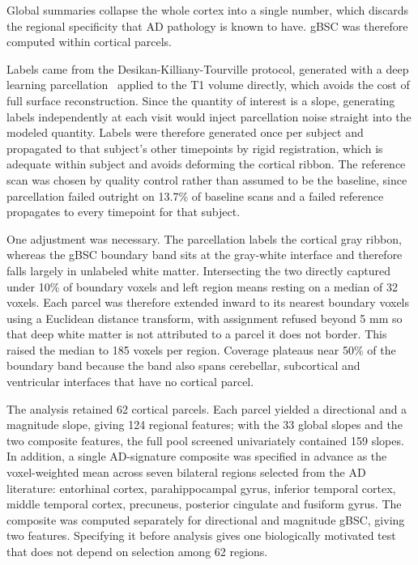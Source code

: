 \documentclass[blue]{ludusofficial}  %
\begin{document}
Global summaries collapse the whole cortex into a single number, which discards the regional specificity that AD pathology is known to have. gBSC was therefore computed within cortical parcels.

Labels came from the Desikan-Killiany-Tourville protocol, generated with a deep learning parcellation~\cite{tustison2021antsxnet} applied to the T1 volume directly, which avoids the cost of full surface reconstruction. Since the quantity of interest is a slope, generating labels independently at each visit would inject parcellation noise straight into the modeled quantity. Labels were therefore generated once per subject and propagated to that subject's other timepoints by rigid registration, which is adequate within subject and avoids deforming the cortical ribbon. The reference scan was chosen by quality control rather than assumed to be the baseline, since parcellation failed outright on 13.7\% of baseline scans and a failed reference propagates to every timepoint for that subject.

One adjustment was necessary. The parcellation labels the cortical gray ribbon, whereas the gBSC boundary band sits at the gray-white interface and therefore falls largely in unlabeled white matter. Intersecting the two directly captured under 10\% of boundary voxels and left region means resting on a median of 32 voxels. Each parcel was therefore extended inward to its nearest boundary voxels using a Euclidean distance transform, with assignment refused beyond 5 mm so that deep white matter is not attributed to a parcel it does not border. This raised the median to 185 voxels per region. Coverage plateaus near 50\% of the boundary band because the band also spans cerebellar, subcortical and ventricular interfaces that have no cortical parcel.

The analysis retained 62 cortical parcels. Each parcel yielded a directional and a magnitude slope, giving 124 regional features; with the 33 global slopes and the two composite features, the full pool screened univariately contained 159 slopes. In addition, a single AD-signature composite was specified in advance as the voxel-weighted mean across seven bilateral regions selected from the AD literature: entorhinal cortex, parahippocampal gyrus, inferior temporal cortex, middle temporal cortex, precuneus, posterior cingulate and fusiform gyrus. The composite was computed separately for directional and magnitude gBSC, giving two features. Specifying it before analysis gives one biologically motivated test that does not depend on selection among 62 regions.
\end{document}

